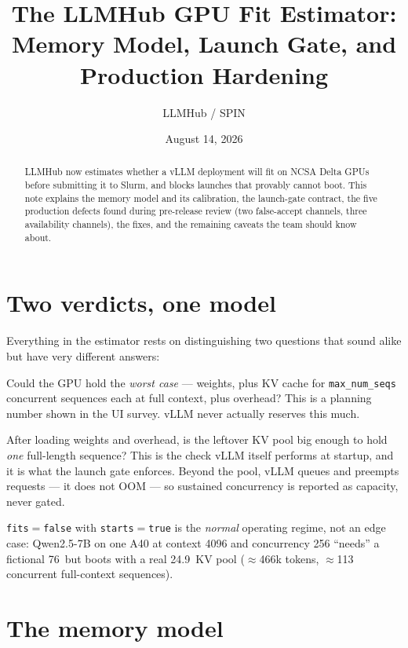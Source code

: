 \documentclass[11pt]{article}
\title{The LLMHub GPU Fit Estimator:\\ Memory Model, Launch Gate, and Production Hardening}
\author{LLMHub / SPIN}
\date{August 14, 2026}
\newcommand{\code}[1]{\texttt{#1}}
\newcommand{\gib}{\,\text{GiB}}
\begin{document}
\maketitle

\begin{abstract}
LLMHub now estimates whether a vLLM deployment will fit on NCSA Delta GPUs
before submitting it to Slurm, and blocks launches that provably cannot boot.
This note explains the memory model and its calibration, the launch-gate
contract, the five production defects found during pre-release review (two
false-accept channels, three availability channels), the fixes, and the
remaining caveats the team should know about.
\end{abstract}

\section{Two verdicts, one model}

Everything in the estimator rests on distinguishing two questions that sound
alike but have very different answers:

\begin{description}[leftmargin=1.6em]
\item[``Does it fit?'' (\code{fits})] Could the GPU hold the \emph{worst
  case} --- weights, plus KV cache for \code{max\_num\_seqs} concurrent
  sequences each at full context, plus overhead? This is a planning number
  shown in the UI survey. vLLM never actually reserves this much.
\item[``Does it boot?'' (\code{starts})] After loading weights and overhead,
  is the leftover KV pool big enough to hold \emph{one} full-length sequence?
  This is the check vLLM itself performs at startup, and it is what the launch
  gate enforces. Beyond the pool, vLLM queues and preempts requests --- it does
  not OOM --- so sustained concurrency is reported as capacity, never gated.
\end{description}

\noindent
\code{fits}${}=$\code{false} with \code{starts}${}=$\code{true} is the
\emph{normal} operating regime, not an edge case: Qwen2.5-7B on one A40 at
context 4096 and concurrency 256 ``needs'' a fictional 76\gib{} but boots with
a real 24.9\gib{} KV pool ($\approx$466k tokens, $\approx$113 concurrent
full-context sequences).

\section{The memory model}
\end{document}
